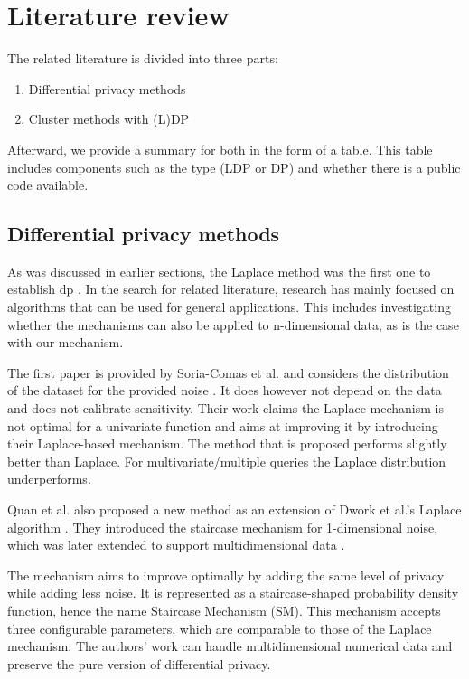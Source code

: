 \section{Literature review}
The related literature is divided into three parts:
\begin{enumerate}
  \item Differential privacy methods
  \item Cluster methods with (L)DP
\end{enumerate}
Afterward, we provide a summary for both in the form of a table.
This table includes components such as the type (LDP or DP) and whether there is a public code available.

\subsection{Differential privacy methods}
As was discussed in earlier sections, the Laplace method was the first one to establish \gls{dp} \citep{dwork_differential_2006}.
In the search for related literature, research has mainly focused on algorithms that can be used for general applications.
This includes investigating whether the mechanisms can also be applied to n-dimensional data, as is the case with our mechanism.

The first paper is provided by Soria-Comas et al. and considers the distribution of the dataset for the provided noise \citep{soria-comas_optimal_2013}.
It does however not depend on the data and does not calibrate sensitivity.
Their work claims the Laplace mechanism is not optimal for a univariate function and aims at improving it by introducing their Laplace-based mechanism.
The method that is proposed performs slightly better than Laplace.
For multivariate/multiple queries the Laplace distribution underperforms.

Quan et al. also proposed a new method as an extension of Dwork et al.'s Laplace algorithm \citep{geng_staircase_2013}.
They introduced the staircase mechanism for 1-dimensional noise, which was later extended to support multidimensional data \citep{geng_staircase_2015}.

The mechanism aims to improve optimally by adding the same level of privacy while adding less noise.
It is represented as a staircase-shaped probability density function, hence the name Staircase Mechanism (SM).
This mechanism accepts three configurable parameters, which are comparable to those of the Laplace mechanism.
The authors' work can handle multidimensional numerical data and preserve the pure version of differential privacy.

